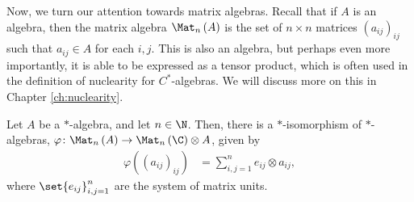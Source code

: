 Now, we turn our attention towards matrix algebras. Recall that if $A$ is an algebra, then the matrix algebra $\Mat_n\left( A \right)$ is the set of $n\times n$ matrices $\left( a_{ij} \right)_{ij}$ such that $a_{ij}\in A$ for each $i,j$. This is also an algebra, but perhaps even more importantly, it is able to be expressed as a tensor product, which is often used in the definition of nuclearity for $C^{\ast}$-algebras. We will discuss more on this in Chapter \ref{ch:nuclearity}.
\begin{theorem}
  Let $A$ be a $\ast$-algebra, and let $n\in \N$. Then, there is a $\ast$-isomorphism of $\ast$-algebras, $\varphi\colon \Mat_n\left( A \right)\rightarrow \Mat_n\left( \C \right)\otimes A$, given by
  \begin{align*}
    \varphi\left( \left( a_{ij} \right)_{ij} \right) &= \sum_{i,j=1}^{n}e_{ij}\otimes a_{ij},
  \end{align*}
  where $\set{e_{ij}}_{i,j=1}^{n}$ are the system of matrix units.
\end{theorem}
